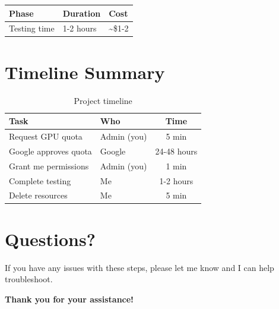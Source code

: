 \documentclass[11pt,a4paper]{article}
\begin{document}
\begin{table}[h]
\centering
\begin{tabular}{@{}lll@{}}
\toprule
\textbf{Phase} & \textbf{Duration} & \textbf{Cost} \\
\midrule
Testing time & 1-2 hours & \textasciitilde\$1-2 \\
\bottomrule
\end{tabular}
\end{table}

\section{Timeline Summary}

\begin{table}[h]
\centering
\begin{tabular}{@{}llc@{}}
\toprule
\textbf{Task} & \textbf{Who} & \textbf{Time} \\
\midrule
Request GPU quota & Admin (you) & 5 min \\
Google approves quota & Google & 24-48 hours \\
Grant me permissions & Admin (you) & 1 min \\
Complete testing & Me & 1-2 hours \\
Delete resources & Me & 5 min \\
\bottomrule
\end{tabular}
\caption{Project timeline}
\end{table}

\section{Questions?}

If you have any issues with these steps, please let me know and I can help troubleshoot.

\vspace{2em}

\begin{center}
\textbf{Thank you for your assistance!}
\end{center}
\end{document}
